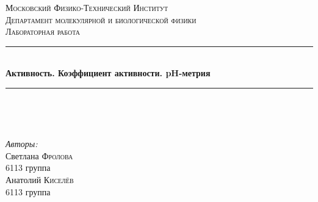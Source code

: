 \documentclass[a4paper, 12pt]{article}
\begin{document}
\begin{titlepage}

\newcommand{\HRule}{\rule{\linewidth}{0.5mm}} %

\center %
 

\textsc{\LARGE Московский Физико-Технический Институт}\\[1,5cm] %
\textsc{\Large Департамент молекулярной и биологической физики}\\[2cm] %
\textsc{\large Лабораторная работа}\\[0.5cm] %


\HRule
\\[0.4cm]
{ \huge \bfseries Активность. Коэффициент активности. pH-метрия}
\\[0.2cm] %
\HRule
\\[1.5cm]


 
\begin{minipage}{0.4\textwidth}
	\begin{flushleft}		
	\end{flushleft}
\end{minipage}
~
\begin{minipage}{0.4\textwidth}
	\begin{flushright} \large
		\emph{Авторы:}\\
		Светлана \textsc{Фролова} \\
		6113 группа \\
		Анатолий \textsc{Киселёв} \\
		6113 группа
	\end{flushright}
\end{minipage}



\end{titlepage}
\end{document}
